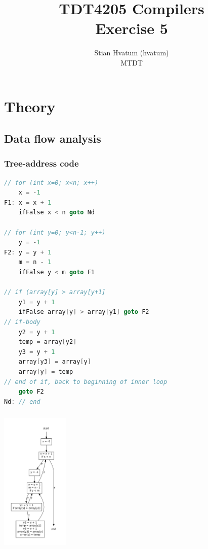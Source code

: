 \documentclass[english,a4paper]{scrartcl}
\title{TDT4205 Compilers\\
\Huge Exercise 5}
\author{Stian Hvatum (hvatum)\\MTDT}
\begin{document}
\maketitle
\tableofcontents
\newpage
\section{Theory}
\begin{minipage}[b]{0.5\linewidth}
 \centering
\subsection{Data flow analysis}
\subsubsection{Tree-address code}
\begin{lstlisting}[language=C,morekeywords={ifFalse}]
// for (int x=0; x<n; x++)
    x = -1
F1: x = x + 1
    ifFalse x < n goto Nd

// for (int y=0; y<n-1; y++)    
    y = -1
F2: y = y + 1
    m = n - 1
    ifFalse y < m goto F1
    
// if (array[y] > array[y+1]    
    y1 = y + 1
    ifFalse array[y] > array[y1] goto F2
// if-body
    y2 = y + 1
    temp = array[y2]
    y3 = y + 1
    array[y3] = array[y]
    array[y] = temp
// end of if, back to beginning of inner loop
    goto F2
Nd: // end
\end{lstlisting}
 
 \end{minipage}
 \hspace{0.5cm}
 \begin{minipage}[b]{0.5\linewidth}
 \centering
\subsubsection{}
\includegraphics[height=250px]{flowgraph.pdf}

 \end{minipage}
\end{document}
